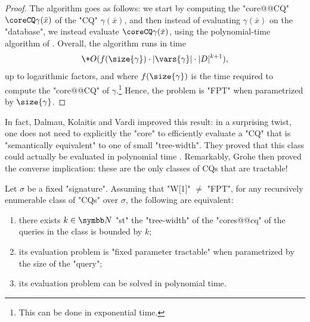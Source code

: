 \begin{proof}
	The algorithm goes as follows:
	we start by computing the "core@@CQ" $\coreCQ\gamma(\bar x)$
	of the "CQ" $\gamma(\bar x)$, and then instead of evaluating
	$\gamma(\bar x)$ on the "database", we instead evaluate
	$\coreCQ\gamma(\bar x)$, using the polynomial-time algorithm
	of .
	Overall, the algorithm runs in time
	\[
		\+O(f(\size{\gamma})\cdot|\vars{\gamma}|\cdot |D|^{k+1}),
	\]
	up to logarithmic factors, and where $f(\size{\gamma})$
	is the time required to compute the "core@@CQ" of
	$\gamma$.\footnote{This can be done in exponential time.}
	Hence, the problem is "FPT" when parametrized by $\size{\gamma}$.
\end{proof}

In fact, Dalmau, Kolaitis and Vardi improved this result: in a surprising twist, 
one does not need to explicitly the "core" to efficiently evaluate
a "CQ" that is "semantically equivalent" to one of small "tree-width".
They proved that this class could actually be evaluated in polynomial time
\cite[Corollary~5]{DalmauKolaitisVardi2002Constraint}.
Remarkably, Grohe then proved the converse implication: these 
are the only classes of CQs that are tractable!
\begin{proposition}
	Let $\sigma$ be a fixed "signature".
	Assuming that "W[1]" $\neq$ "FPT", for any recursively enumerable
	class of "CQs" over $\sigma$, the following are equivalent:
	\begin{enumerate}
		\item there exists $k\in\N$ "st" the "tree-width" of the "cores@@cq"
			of the queries in the class is bounded by $k$;
		\item its evaluation problem is "fixed parameter tractable"
			when parametrized by the size of the "query";
		\item its evaluation problem can be solved in polynomial time.
	\end{enumerate}
\end{proposition}

